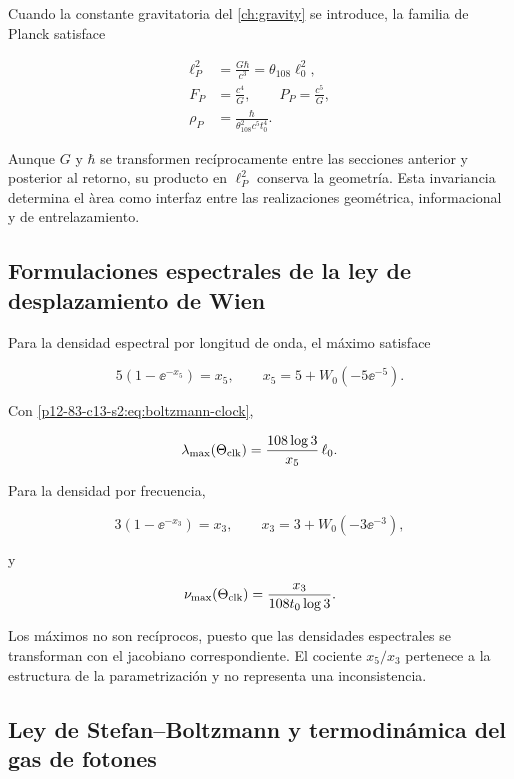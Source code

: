 Cuando la constante gravitatoria del \cref{ch:gravity} se introduce, la familia de Planck satisface

\begin{align}
\ell_P^2&=\frac{G\hbar}{c^3}=\theta_{108}\ell_0^2,
\label{p12-83-c13-s2:eq:planck-area}\\
F_P&=\frac{c^4}{G},
\qquad
P_P=\frac{c^5}{G},
\label{p12-83-c13-s2:eq:planck-force-power}\\
\rho_P&=\frac{\hbar}{\theta_{108}^2c^5t_0^4}.
\label{p12-83-c13-s2:eq:planck-density}
\end{align}

Aunque \(G\) y \(\hbar\) se transformen rec\'iprocamente entre las secciones
anterior y posterior al retorno, su producto en \(\ell_P^2\) conserva la
geometr\'ia. Esta invariancia determina el \`area como interfaz entre las
realizaciones geom\'etrica, informacional y de entrelazamiento.

\subsection{Formulaciones espectrales de la ley de desplazamiento de Wien}

Para la densidad espectral por longitud de onda, el m\'aximo satisface

\[
5(1-\ee^{-x_5})=x_5,
\qquad
x_5=5+W_0(-5\ee^{-5}).
\]

Con \cref{p12-83-c13-s2:eq:boltzmann-clock},

\begin{equation}
\lambda_{\max}(\Theta_{\rm clk})
=\frac{108\log3}{x_5}\,\ell_0.
\label{p12-83-c13-s2:eq:wien-lambda}
\end{equation}

Para la densidad por frecuencia,

\[
3(1-\ee^{-x_3})=x_3,
\qquad
x_3=3+W_0(-3\ee^{-3}),
\]

y

\begin{equation}
\nu_{\max}(\Theta_{\rm clk})
=\frac{x_3}{108t_0\log3}.
\label{p12-83-c13-s2:eq:wien-frequency}
\end{equation}

Los m\'aximos no son rec\'iprocos, puesto que las densidades espectrales se
transforman con el jacobiano correspondiente. El cociente \(x_5/x_3\)
pertenece a la estructura de la parametrizaci\'on y no representa una
inconsistencia.

\subsection{Ley de Stefan--Boltzmann y termodin\'amica del gas de fotones}

